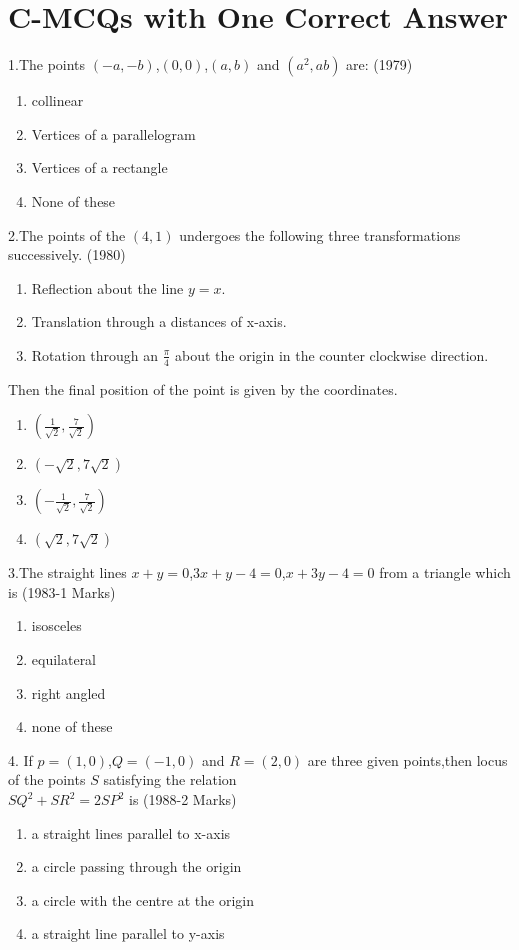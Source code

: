 \documentclass[journal,12pt,twocolumn]{IEEEtran}
\theoremstyle{remark}
\begin{document}
\section {C-MCQs with One Correct Answer}
1.The points $(-a,-b)$,$(0,0)$,$(a,b)$ and $(a^2,ab)$ are:
\hfill(1979)
\begin{enumerate}
    \item collinear
    \item Vertices of a parallelogram
    \item Vertices of a rectangle 
    \item None of these
\end{enumerate}
2.The points of the $(4,1)$ undergoes the following three transformations successively.
\hfill(1980)
\begin{enumerate}
    \item Reflection about the line $y=x.$
    \item Translation through a distances of x-axis.
    \item Rotation through an $\frac{\pi}{4}$ about the origin in the counter clockwise direction.
\end{enumerate}
    Then the final position of the point is given by the coordinates.
\begin{enumerate}
    \item $\left(\frac{1}{\sqrt{2}},\frac{7}{\sqrt{2}} \right)$
    \item $(-\sqrt{2},7\sqrt{2})$
    \item $\left(-\frac{1}{\sqrt{2}},\frac{7}{\sqrt{2}} \right)$
    \item $(\sqrt{2},7\sqrt{2})$
\end{enumerate}
3.The straight lines $x+y=0$,$3x+y-4=0$,$x+3y-4=0$ from a triangle which is 
\hfill(1983-1 Marks)
\begin{enumerate}
    \item isosceles
    \item equilateral 
    \item right angled
    \item none of these
\end{enumerate}
4. If $p=(1,0)$,$Q=(-1,0)$ and $R=(2,0)$ are three given points,then locus of the points $S$ satisfying the relation\\
    $SQ^2+SR^2=2SP^2$ is 
\hfill(1988-2 Marks)
\begin{enumerate}
    \item a straight lines parallel to x-axis
    \item a circle passing through the origin
    \item a circle with the centre at the origin 
    \item a straight line parallel to y-axis
\end{enumerate}
\end{document}
